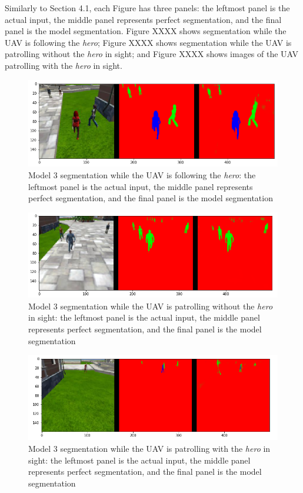 \documentclass[a4paper]{article}
\begin{document}
Similarly to Section 4.1, each Figure has three panels: the leftmost panel is the actual input, the middle panel represents perfect segmentation, and the final panel is the model segmentation. Figure XXXX shows segmentation while the UAV is following the \textit{hero}; Figure XXXX shows segmentation while the UAV is patrolling without the \textit{hero} in sight; and Figure XXXX shows images of the UAV patrolling with the \textit{hero} in sight.
\begin{figure}[h]
\centering
\includegraphics[scale=0.4]{model_3_1}
\caption{Model 3 segmentation while the UAV is following the \textit{hero}: the leftmost panel is the actual input, the middle panel represents perfect segmentation, and the final panel is the model segmentation}
\end{figure}

\begin{figure}[h]
\centering
\includegraphics[scale=0.4]{model_3_2}
\caption{Model 3 segmentation while the UAV is patrolling without the \textit{hero} in sight: the leftmost panel is the actual input, the middle panel represents perfect segmentation, and the final panel is the model segmentation}
\end{figure}

\begin{figure}[h]
\centering
\includegraphics[scale=0.4]{model_3_3}
\caption{Model 3 segmentation while the UAV is patrolling with the \textit{hero} in sight: the leftmost panel is the actual input, the middle panel represents perfect segmentation, and the final panel is the model segmentation}
\end{figure}
\end{document}
